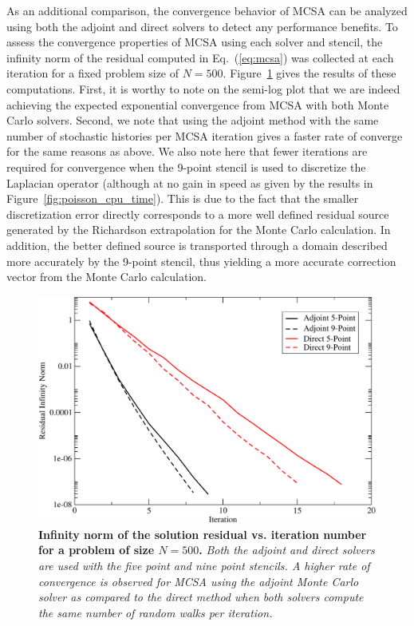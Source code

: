 As an additional comparison, the convergence behavior of MCSA can be
analyzed using both the adjoint and direct solvers to detect any
performance benefits. To assess the convergence properties of MCSA
using each solver and stencil, the infinity norm of the residual
computed in Eq.~(\ref{eq:mcsa}) was collected at each iteration for a
fixed problem size of $N=500$. Figure~\ref{fig:poisson_convergence}
gives the results of these computations. First, it is worthy to note
on the semi-log plot that we are indeed achieving the expected
exponential convergence from MCSA with both Monte Carlo
solvers. Second, we note that using the adjoint method with the same
number of stochastic histories per MCSA iteration gives a faster rate
of converge for the same reasons as above. We also note here that
fewer iterations are required for convergence when the 9-point stencil
is used to discretize the Laplacian operator (although at no gain in
speed as given by the results in
Figure~\ref{fig:poisson_cpu_time}). This is due to the fact that the
smaller discretization error directly corresponds to a more well
defined residual source generated by the Richardson extrapolation for
the Monte Carlo calculation. In addition, the better defined source is
transported through a domain described more accurately by the 9-point
stencil, thus yielding a more accurate correction vector from the
Monte Carlo calculation.
\begin{figure}[t!]
  \centering
  \includegraphics[width=5in,clip]{chapters/mc_background/dir_adj_conv.pdf}
  \caption{\textbf{Infinity norm of the solution residual
      vs. iteration number for a problem of size $N=500$.}
    \textit{Both the adjoint and direct solvers are used with the five
      point and nine point stencils. A higher rate of convergence is
      observed for MCSA using the adjoint Monte Carlo solver as
      compared to the direct method when both solvers compute the same
      number of random walks per iteration.}}
  \label{fig:poisson_convergence}
\end{figure}

